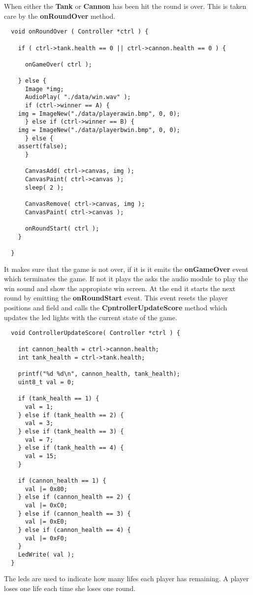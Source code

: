 When either the {\bf Tank} or {\bf Cannon} has been hit the round is over. This is
taken care by the {\bf onRoundOver} method.
\begin{lstlisting}
  void onRoundOver ( Controller *ctrl ) {

    if ( ctrl->tank.health == 0 || ctrl->cannon.health == 0 ) {

      onGameOver( ctrl );

    } else {
      Image *img;
      AudioPlay( "./data/win.wav" );
      if (ctrl->winner == A) {
	img = ImageNew("./data/playerawin.bmp", 0, 0);
      } else if (ctrl->winner == B) {
	img = ImageNew("./data/playerbwin.bmp", 0, 0);
      } else {
	assert(false);
      }

      CanvasAdd( ctrl->canvas, img );
      CanvasPaint( ctrl->canvas );
      sleep( 2 );

      CanvasRemove( ctrl->canvas, img );
      CanvasPaint( ctrl->canvas );

      onRoundStart( ctrl );
    }

  }
\end{lstlisting}

It makes sure that the game is not over, if it is it emits the {\bf onGameOver} event which
terminates the game. If not it plays the asks the audio module to play the win sound and show the
appropiate win screen. At the end it starts the next round by emitting the {\bf onRoundStart} event.
This event resets the player positions and field and calls the {\bf CpntrollerUpdateScore} method
which updates the led lights with the current state of the game.
\begin{lstlisting}
  void ControllerUpdateScore( Controller *ctrl ) {

    int cannon_health = ctrl->cannon.health;
    int tank_health = ctrl->tank.health;

    printf("%d %d\n", cannon_health, tank_health);
    uint8_t val = 0;

    if (tank_health == 1) {
      val = 1;
    } else if (tank_health == 2) {
      val = 3;
    } else if (tank_health == 3) {
      val = 7;
    } else if (tank_health == 4) {
      val = 15;
    }

    if (cannon_health == 1) {
      val |= 0x80;
    } else if (cannon_health == 2) {
      val |= 0xC0;
    } else if (cannon_health == 3) {
      val |= 0xE0;
    } else if (cannon_health == 4) {
      val |= 0xF0;
    }
    LedWrite( val );
  }
\end{lstlisting}
The leds are used to indicate how many lifes each player has remaining. A player loses one life each
time she loses one round.

